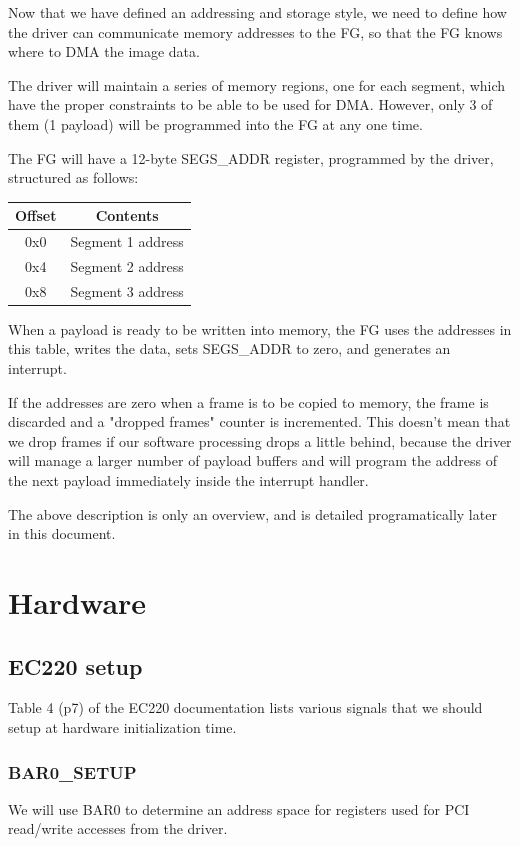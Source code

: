 \documentclass[12pt]{article}
\begin{document}
Now that we have defined an addressing and storage style, we need to define how the driver can communicate memory addresses to the FG, so that the FG knows
where to DMA the image data.

The driver will maintain a series of memory regions, one for each segment, which have the proper constraints to be able to be used for DMA. However, only 3 of them (1 payload) will be programmed into the FG at any one time.

The FG will have a 12-byte SEGS\_ADDR register, programmed by the driver, structured as follows:

\begin{tabular}{|c|c|} \hline
\textbf{Offset} & \textbf{Contents} \\ \hline
0x0 & Segment 1 address \\ \hline
0x4 & Segment 2 address \\ \hline
0x8 & Segment 3 address \\ \hline
\end{tabular}

When a payload is ready to be written into memory, the FG uses the addresses in this table, writes the data, sets SEGS\_ADDR to zero, and generates an interrupt.

If the addresses are zero when a frame is to be copied to memory, the frame is discarded and a "dropped frames" counter is incremented. This doesn't mean that we drop frames if our software processing drops a little behind, because the driver will manage a larger number of payload buffers and will program the address of the next payload immediately inside the interrupt handler.

The above description is only an overview, and is detailed programatically later in this document.


\section{Hardware}

\subsection{EC220 setup}

Table 4 (p7) of the EC220 documentation lists various signals that we should setup at hardware initialization time.

\subsubsection{BAR0\_SETUP}
We will use BAR0 to determine an address space for registers used for PCI read/write accesses from the driver.
\end{document}
